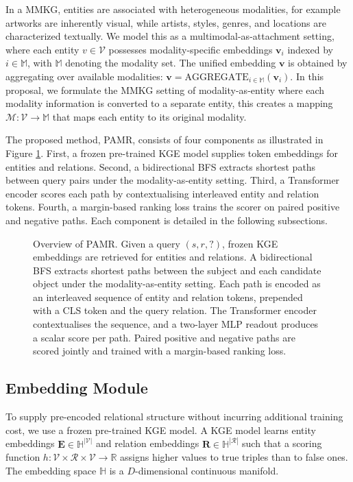 \documentclass[runningheads]{llncs}
\begin{document}
In a MMKG, entities are associated with heterogeneous modalities, for example artworks are inherently visual, while artists,
styles, genres, and locations are characterized textually. We model
this as a multimodal-as-attachment setting, where each entity $v \in \mathcal{V}$
possesses modality-specific embeddings $\mathbf{v}_i$ indexed by
$i \in \mathbb{M}$, with $\mathbb{M}$ denoting the modality set.
The unified embedding $\mathbf{v}$ is obtained
by aggregating over available modalities: $\mathbf{v} =
\text{AGGREGATE}_{i \in \mathbb{M}} (\mathbf{v}_i)$. In this proposal, we formulate the MMKG setting of modality-as-entity where each modality information is converted to a separate entity, this creates a mapping $\mathcal{M}: \mathcal{V} \to \mathbb{M}$ that maps each entity to its original modality.

The proposed method, PAMR, consists of four components as illustrated in Figure \ref{fig:overview}. First, a frozen
pre-trained KGE model supplies token embeddings for entities and relations.
Second, a bidirectional BFS extracts shortest paths between query pairs under the modality-as-entity setting.
Third, a Transformer encoder scores each path by contextualising
interleaved entity and relation tokens. Fourth, a margin-based ranking
loss trains the scorer on paired positive and negative paths. Each
component is detailed in the following subsections.

\begin{figure}[t]
  \centering
  
  \caption{Overview of PAMR. Given a query $(s, r, ?)$, frozen KGE embeddings are retrieved for entities and relations. A bidirectional BFS extracts shortest paths between the subject and each candidate object under the modality-as-entity setting. Each path is encoded as an interleaved sequence of entity and relation tokens, prepended with a CLS token and the query relation. The Transformer encoder contextualises the sequence, and a two-layer MLP readout produces a scalar score per path. Paired positive and negative paths are scored jointly and trained with a margin-based ranking loss.}
  \label{fig:overview}
\end{figure}

\subsection{Embedding Module}
\label{sec:embedding-module}

To supply pre-encoded relational structure without incurring additional
training cost, we use a frozen pre-trained KGE model.  A KGE model
learns entity embeddings $\mathbf{E} \in \mathbb{H}^{|\mathcal{V}|}$
and relation embeddings $\mathbf{R} \in \mathbb{H}^{|\mathcal{R}|}$
such that a scoring function $h: \mathcal{V} \times \mathcal{R} \times
\mathcal{V} \to \mathbb{R}$ assigns higher values to true triples
than to false ones.  The embedding space $\mathbb{H}$ is a
$D$-dimensional continuous manifold.
\end{document}
